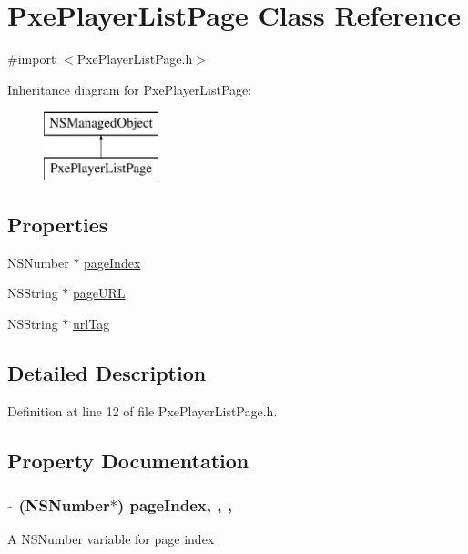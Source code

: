 \hypertarget{interface_pxe_player_list_page}{\section{Pxe\-Player\-List\-Page Class Reference}
\label{interface_pxe_player_list_page}
}


{\ttfamily \#import $<$Pxe\-Player\-List\-Page.\-h$>$}

Inheritance diagram for Pxe\-Player\-List\-Page\-:\begin{figure}[H]
\begin{center}
\leavevmode
\includegraphics[height=2.000000cm]{interface_pxe_player_list_page}
\end{center}
\end{figure}
\subsection*{Properties}
\begin{DoxyCompactItemize}
\item 
N\-S\-Number $\ast$ \hyperlink{interface_pxe_player_list_page_a71b187ae06b78a81b0039e24b97ec243}{page\-Index}
\item 
N\-S\-String $\ast$ \hyperlink{interface_pxe_player_list_page_a1cc9ccb5cb6469d229ec0d504ce70d21}{page\-U\-R\-L}
\item 
N\-S\-String $\ast$ \hyperlink{interface_pxe_player_list_page_a6ae590b4ac2d96af1bdc01b6ff1c5ce7}{url\-Tag}
\end{DoxyCompactItemize}


\subsection{Detailed Description}


Definition at line 12 of file Pxe\-Player\-List\-Page.\-h.



\subsection{Property Documentation}
\hypertarget{interface_pxe_player_list_page_a71b187ae06b78a81b0039e24b97ec243}{
\subsubsection[{page\-Index}]{\setlength{\rightskip}{0pt plus 5cm}-\/ (N\-S\-Number$\ast$) page\-Index\hspace{0.3cm}{\ttfamily [read]}, {\ttfamily [write]}, {\ttfamily [nonatomic]}, {\ttfamily [retain]}}}\label{interface_pxe_player_list_page_a71b187ae06b78a81b0039e24b97ec243}
A N\-S\-Number variable for page index 

